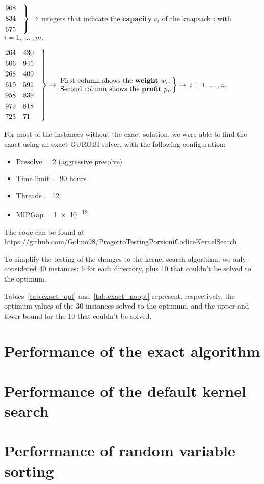 	\begin{flushleft}
		$\begin{rcases*}
			908 \quad
			\\834 
			\\675 
		\end{rcases*} \rightarrow $ integers that indicate the \textbf{capacity}  $ c_{i} $  of the knapsack i with \space $ i=1,\:\dots\:,m. $
	\end{flushleft}
	\begin{flushleft}
		$\begin{rcases*}
			264	\quad 430 \quad
			\\606 \quad	945
			\\268 \quad	409
			\\619 \quad	591
			\\958 \quad	839
			\\972 \quad	818
			\\723 \quad	71
		\end{rcases*} \rightarrow $ 
		$\begin{rcases*}
			{\begin{tabular}{@{}l@{}}
				First column shows the \textbf{weight} $ w_{i}. $ \\
				Second column shows the \textbf{profit} $ p_{i} $.
			\end{tabular}} 
		\end{rcases*} \rightarrow \space$ $ i=1,\:\dots\:,n. $
	\end{flushleft}

For most of the instances without the exact solution, we were able to
find the exact using an exact GUROBI solver, with the following configuration:
\newpage
\begin{itemize}
    \item Presolve = 2 (aggressive presolve)
    \item Time limit = 90 hours
    \item Threads = 12
    \item MIPGap = \num{1e-12}
\end{itemize}

The code can be found at \url{https://github.com/Golino98/ProgettoTestingPorzioniCodiceKernelSearch}

To simplify the testing of the changes to the kernel search algorithm,
we only considered 40 instances: 6 for each directory,
plus 10 that couldn't be solved to the optimum.

Tables~\ref{tab:exact_opt} and~\ref{tab:exact_noopt} represent,
respectively, the optimum values of the 30 instances solved to
the optimum, and the upper and lower bound for the 10
that couldn't be solved.




\section{Performance of the exact algorithm}


\section{Performance of the default kernel search}


\section{Performance of random variable sorting}
